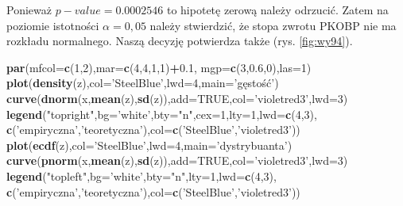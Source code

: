 \documentclass[polish,]{book}
\newenvironment{Shaded}{\begin{snugshade}}{\end{snugshade}}
\newcommand{\DataTypeTok}[1]{\textcolor[rgb]{0.13,0.29,0.53}{#1}}
\newcommand{\DecValTok}[1]{\textcolor[rgb]{0.00,0.00,0.81}{#1}}
\newcommand{\FloatTok}[1]{\textcolor[rgb]{0.00,0.00,0.81}{#1}}
\newcommand{\KeywordTok}[1]{\textcolor[rgb]{0.13,0.29,0.53}{\textbf{#1}}}
\newcommand{\NormalTok}[1]{#1}
\newcommand{\OperatorTok}[1]{\textcolor[rgb]{0.81,0.36,0.00}{\textbf{#1}}}
\newcommand{\OtherTok}[1]{\textcolor[rgb]{0.56,0.35,0.01}{#1}}
\newcommand{\StringTok}[1]{\textcolor[rgb]{0.31,0.60,0.02}{#1}}
\begin{document}
Ponieważ \(p-value = 0.0002546\) to hipotetę zerową należy odrzucić. Zatem na
poziomie istotności \(\alpha = 0,05\) należy stwierdzić, że stopa zwrotu PKOBP nie ma rozkładu normalnego. Naszą decyzję potwierdza także (rys. \ref{fig:wy94}).

\begin{Shaded}
\begin{Highlighting}[]
\KeywordTok{par}\NormalTok{(}\DataTypeTok{mfcol=}\KeywordTok{c}\NormalTok{(}\DecValTok{1}\NormalTok{,}\DecValTok{2}\NormalTok{),}\DataTypeTok{mar=}\KeywordTok{c}\NormalTok{(}\DecValTok{4}\NormalTok{,}\DecValTok{4}\NormalTok{,}\DecValTok{1}\NormalTok{,}\DecValTok{1}\NormalTok{)}\OperatorTok{+}\FloatTok{0.1}\NormalTok{, }\DataTypeTok{mgp=}\KeywordTok{c}\NormalTok{(}\DecValTok{3}\NormalTok{,}\FloatTok{0.6}\NormalTok{,}\DecValTok{0}\NormalTok{),}\DataTypeTok{las=}\DecValTok{1}\NormalTok{)}
\KeywordTok{plot}\NormalTok{(}\KeywordTok{density}\NormalTok{(z),}\DataTypeTok{col=}\StringTok{'SteelBlue'}\NormalTok{,}\DataTypeTok{lwd=}\DecValTok{4}\NormalTok{,}\DataTypeTok{main=}\StringTok{'gęstość'}\NormalTok{)}
\KeywordTok{curve}\NormalTok{(}\KeywordTok{dnorm}\NormalTok{(x,}\KeywordTok{mean}\NormalTok{(z),}\KeywordTok{sd}\NormalTok{(z)),}\DataTypeTok{add=}\OtherTok{TRUE}\NormalTok{,}\DataTypeTok{col=}\StringTok{'violetred3'}\NormalTok{,}\DataTypeTok{lwd=}\DecValTok{3}\NormalTok{)}
\KeywordTok{legend}\NormalTok{(}\StringTok{"topright"}\NormalTok{,}\DataTypeTok{bg=}\StringTok{'white'}\NormalTok{,}\DataTypeTok{bty=}\StringTok{"n"}\NormalTok{,}\DataTypeTok{cex=}\DecValTok{1}\NormalTok{,}\DataTypeTok{lty=}\DecValTok{1}\NormalTok{,}\DataTypeTok{lwd=}\KeywordTok{c}\NormalTok{(}\DecValTok{4}\NormalTok{,}\DecValTok{3}\NormalTok{),}
       \KeywordTok{c}\NormalTok{(}\StringTok{'empiryczna'}\NormalTok{,}\StringTok{'teoretyczna'}\NormalTok{),}\DataTypeTok{col=}\KeywordTok{c}\NormalTok{(}\StringTok{'SteelBlue'}\NormalTok{,}\StringTok{'violetred3'}\NormalTok{))}
\KeywordTok{plot}\NormalTok{(}\KeywordTok{ecdf}\NormalTok{(z),}\DataTypeTok{col=}\StringTok{'SteelBlue'}\NormalTok{,}\DataTypeTok{lwd=}\DecValTok{4}\NormalTok{,}\DataTypeTok{main=}\StringTok{'dystrybuanta'}\NormalTok{)}
\KeywordTok{curve}\NormalTok{(}\KeywordTok{pnorm}\NormalTok{(x,}\KeywordTok{mean}\NormalTok{(z),}\KeywordTok{sd}\NormalTok{(z)),}\DataTypeTok{add=}\OtherTok{TRUE}\NormalTok{,}\DataTypeTok{col=}\StringTok{'violetred3'}\NormalTok{,}\DataTypeTok{lwd=}\DecValTok{3}\NormalTok{)}
\KeywordTok{legend}\NormalTok{(}\StringTok{"topleft"}\NormalTok{,}\DataTypeTok{bg=}\StringTok{'white'}\NormalTok{,}\DataTypeTok{bty=}\StringTok{"n"}\NormalTok{,}\DataTypeTok{lty=}\DecValTok{1}\NormalTok{,}\DataTypeTok{lwd=}\KeywordTok{c}\NormalTok{(}\DecValTok{4}\NormalTok{,}\DecValTok{3}\NormalTok{),}
       \KeywordTok{c}\NormalTok{(}\StringTok{'empiryczna'}\NormalTok{,}\StringTok{'teoretyczna'}\NormalTok{),}\DataTypeTok{col=}\KeywordTok{c}\NormalTok{(}\StringTok{'SteelBlue'}\NormalTok{,}\StringTok{'violetred3'}\NormalTok{))}
\end{Highlighting}
\end{Shaded}
\end{document}
